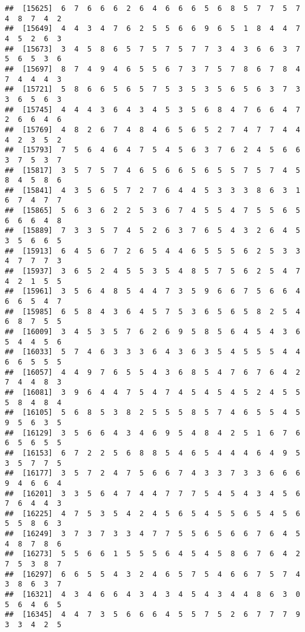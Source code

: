\documentclass[
]{book}
\begin{document}
\begin{verbatim}
##  [15625]  6  7  6  6  6  2  6  4  6  6  6  5  6  8  5  7  7  5  7  4  8  7  4  2
##  [15649]  4  4  3  4  7  6  2  5  5  6  6  9  6  5  1  8  4  4  7  4  5  2  6  3
##  [15673]  3  4  5  8  6  5  7  5  7  5  7  7  3  4  3  6  6  3  7  5  6  5  3  6
##  [15697]  8  7  4  9  4  6  5  5  6  7  3  7  5  7  8  6  7  8  4  7  4  4  4  3
##  [15721]  5  8  6  6  5  6  5  7  5  3  5  3  5  6  5  6  3  7  3  3  6  5  6  3
##  [15745]  4  4  4  3  6  4  3  4  5  3  5  6  8  4  7  6  6  4  7  2  6  6  4  6
##  [15769]  4  8  2  6  7  4  8  4  6  5  6  5  2  7  4  7  7  4  4  4  2  3  5  2
##  [15793]  7  5  6  4  6  4  7  5  4  5  6  3  7  6  2  4  5  6  6  3  7  5  3  7
##  [15817]  3  5  7  5  7  4  6  5  6  6  5  6  5  5  7  5  7  4  5  8  4  5  8  6
##  [15841]  4  3  5  6  5  7  2  7  6  4  4  5  3  3  3  8  6  3  1  6  7  4  7  7
##  [15865]  5  6  3  6  2  2  5  3  6  7  4  5  5  4  7  5  5  6  5  6  6  6  4  8
##  [15889]  7  3  3  5  7  4  5  2  6  3  7  6  5  4  3  2  6  4  5  3  5  6  6  5
##  [15913]  6  4  5  6  7  2  6  5  4  4  6  5  5  5  6  2  5  3  3  4  7  7  7  3
##  [15937]  3  6  5  2  4  5  5  3  5  4  8  5  7  5  6  2  5  4  7  4  2  1  5  5
##  [15961]  3  5  6  4  8  5  4  4  7  3  5  9  6  6  7  5  6  6  4  6  6  5  4  7
##  [15985]  6  5  8  4  3  6  4  5  7  5  3  6  5  6  5  8  2  5  4  6  8  7  5  5
##  [16009]  3  4  5  3  5  7  6  2  6  9  5  8  5  6  4  5  4  3  6  5  4  4  5  6
##  [16033]  5  7  4  6  3  3  3  6  4  3  6  3  5  4  5  5  5  4  4  6  6  5  5  5
##  [16057]  4  4  9  7  6  5  5  4  3  6  8  5  4  7  6  7  6  4  2  7  4  4  8  3
##  [16081]  3  9  6  4  4  7  5  4  7  4  5  4  5  4  5  2  4  5  5  5  8  4  8  4
##  [16105]  5  6  8  5  3  8  2  5  5  5  8  5  7  4  6  5  5  4  5  9  5  6  3  5
##  [16129]  3  5  6  6  4  3  4  6  9  5  4  8  4  2  5  1  6  7  6  6  5  6  5  5
##  [16153]  6  7  2  2  5  6  8  8  5  4  6  5  4  4  4  6  4  9  5  3  5  7  7  5
##  [16177]  3  5  7  2  4  7  5  6  6  7  4  3  3  7  3  3  6  6  6  9  4  6  6  4
##  [16201]  3  3  5  6  4  7  4  4  7  7  7  5  4  5  4  3  4  5  6  7  6  4  4  3
##  [16225]  4  7  5  3  5  4  2  4  5  6  5  4  5  5  6  5  4  5  6  5  5  8  6  3
##  [16249]  3  7  3  7  3  3  4  7  7  5  5  6  5  6  6  7  6  4  5  4  8  7  8  6
##  [16273]  5  5  6  6  1  5  5  5  6  4  5  4  5  8  6  7  6  4  2  7  5  3  8  7
##  [16297]  6  6  5  5  4  3  2  4  6  5  7  5  4  6  6  7  5  7  4  3  8  6  3  7
##  [16321]  4  3  4  6  6  4  3  4  3  4  5  4  3  4  4  8  6  3  0  5  6  4  6  5
##  [16345]  4  4  7  3  5  6  6  6  4  5  5  7  5  2  6  7  7  7  9  3  3  4  2  5

\end{verbatim}
\end{document}
